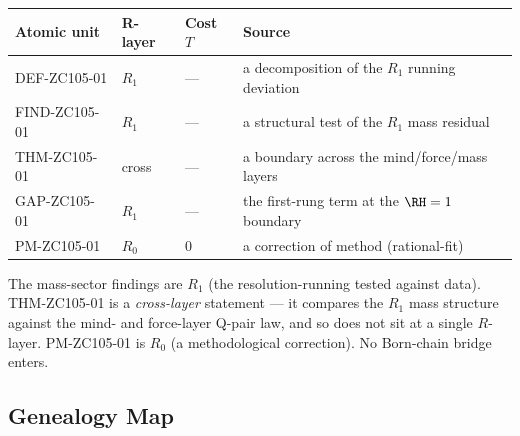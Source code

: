 \documentclass[12pt, a4paper]{article}
\begin{document}
\begin{layerbox}[title={R-Layer Assignments for ZC105}]
{\small\renewcommand{\arraystretch}{1.25}
\begin{center}
\begin{tabular}{@{}llll@{}}
\toprule
Atomic unit & R-layer & Cost $T$ & Source \\
\midrule
DEF-ZC105-01  & $R_1$ & --- & a decomposition of the $R_1$ running deviation \\
FIND-ZC105-01 & $R_1$ & --- & a structural test of the $R_1$ mass residual \\
THM-ZC105-01  & cross & --- & a boundary across the mind/force/mass layers \\
GAP-ZC105-01  & $R_1$ & --- & the first-rung term at the $\RH=1$ boundary \\
PM-ZC105-01   & $R_0$ & $0$ & a correction of method (rational-fit) \\
\bottomrule
\end{tabular}
\end{center}}
The mass-sector findings are $R_1$ (the resolution-running tested against data).
THM-ZC105-01 is a \emph{cross-layer} statement --- it compares the $R_1$ mass
structure against the mind- and force-layer Q-pair law, and so does not sit at a
single $R$-layer. PM-ZC105-01 is $R_0$ (a methodological correction). No
Born-chain bridge enters.
\end{layerbox}

\subsection{Genealogy Map}
\label{sec:genealogy-zc105}
\end{document}
